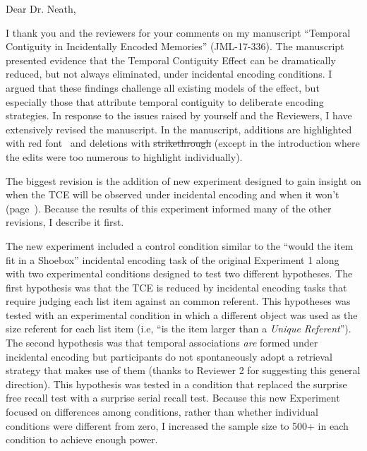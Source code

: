\documentclass[12pt]{article}
\begin{document}
Dear Dr. Neath,
 

I thank you and the reviewers for your comments on my manuscript  ``Temporal Contiguity in Incidentally Encoded Memories'' (JML-17-336). The manuscript presented evidence that the Temporal Contiguity Effect can be dramatically reduced, but not always eliminated, under incidental encoding conditions. I argued that these findings challenge all existing models of the effect, but especially those that attribute temporal contiguity to deliberate encoding strategies. In response to the issues raised by yourself and the Reviewers, I have extensively revised the manuscript. In the manuscript, additions are highlighted with   \color{red}red font\color{black}~ and deletions with \st{strikethrough} (except in the introduction where the edits were too numerous to highlight individually).

The biggest revision is the addition of new experiment designed to gain insight on when the TCE will be observed under incidental encoding and when it won't (page~\pageref{newexp}). Because the results of this experiment informed many of the other revisions, I describe it first.

The new experiment included a control condition similar to the ``would the item fit in a Shoebox'' incidental encoding task of the original Experiment 1 along with two experimental conditions designed to test two different hypotheses. The first hypothesis was that the TCE is reduced by incidental encoding tasks that require judging each list item against an common referent. This hypotheses was tested with an experimental condition in which a different object was used as the size referent for each list item (i.e, ``is the item larger than a \emph{Unique Referent}''). The second hypothesis was that temporal associations \emph{are} formed under incidental encoding but participants do not spontaneously adopt a retrieval strategy that makes use of them (thanks to Reviewer 2 for suggesting this general direction). This hypothesis was tested in a condition that replaced the surprise free recall test with a surprise serial recall test. Because this new Experiment focused on differences among conditions, rather than whether individual conditions were different from zero, I increased the sample size to 500+ in each condition to achieve enough power.
\end{document}
